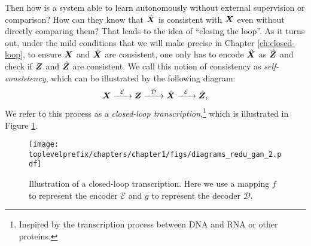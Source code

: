 \documentclass[\toplevelprefix/book-main.tex]{subfiles}
\begin{document}
Then how is a system able to learn autonomously without external supervision or comparison? How can they know that $\hat {\bm{X}}$ is consistent with $\bm{X}$ even without directly comparing them? That leads to the idea of ``closing the loop''. As it turns out, under the mild conditions that we will make precise in Chapter \ref{ch:closed-loop}, to ensure $\bm{X}$ and $\hat {\bm{X}}$ are consistent, one only has to encode $\hat {\bm{X}}$ as $\hat {\bm{Z}}$ and check if $\bm{Z}$ and $\hat {\bm{Z}}$ are consistent. We call this notion of consistency as {\em self-consistency}, which  can be illustrated by the following diagram:
\begin{equation}
    \bm{X}   \xrightarrow{\hspace{2mm} \mathcal{E}\hspace{2mm}} \bm{Z}  \xrightarrow{\hspace{2mm} \mathcal{D} \hspace{2mm}} \hat {\bm{X}} \xrightarrow{\hspace{2mm} \mathcal{E}\hspace{2mm}} \hat {\bm{Z}},
    \label{eqn:closed-loop}
\end{equation}
We refer to this process as a {\em closed-loop transcription},\footnote{Inspired by the transcription process between DNA and RNA or other proteins.} which is illustrated in Figure \ref{fig:closed-loop}.

\begin{figure}[t]
    \centering
\texttt{[image: \\toplevelprefix/chapters/chapter1/figs/diagrams\_redu\_gan\_2.pdf]}
\caption{Illustration of a closed-loop transcription. Here we use a mapping $f$ to represent the encoder $\mathcal{E}$ and $g$ to represent the decoder $\mathcal{D}$.}  \label{fig:closed-loop}
\end{figure}
\end{document}
